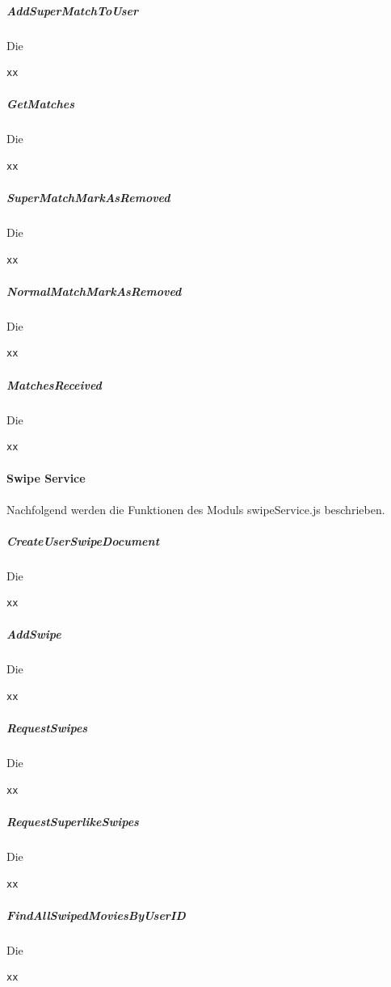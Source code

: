 \subparagraph{AddSuperMatchToUser}
Die

\begin{lstlisting}[caption=TODO, label=lst:TODO]
xx
\end{lstlisting}

\subparagraph{GetMatches}
Die

\begin{lstlisting}[caption=TODO, label=lst:TODO]
xx
\end{lstlisting}

\subparagraph{SuperMatchMarkAsRemoved}
Die

\begin{lstlisting}[caption=TODO, label=lst:TODO]
xx
\end{lstlisting}

\subparagraph{NormalMatchMarkAsRemoved}
Die

\begin{lstlisting}[caption=TODO, label=lst:TODO]
xx
\end{lstlisting}

\subparagraph{MatchesReceived}
Die

\begin{lstlisting}[caption=TODO, label=lst:TODO]
xx
\end{lstlisting}

\paragraph{Swipe Service}
Nachfolgend werden die Funktionen des Moduls 
swipeService.js beschrieben.

\subparagraph{CreateUserSwipeDocument}
Die

\begin{lstlisting}[caption=TODO, label=lst:TODO]
xx
\end{lstlisting}

\subparagraph{AddSwipe}
Die

\begin{lstlisting}[caption=TODO, label=lst:TODO]
xx
\end{lstlisting}

\subparagraph{RequestSwipes}
Die

\begin{lstlisting}[caption=TODO, label=lst:TODO]
xx
\end{lstlisting}

\subparagraph{RequestSuperlikeSwipes}
Die

\begin{lstlisting}[caption=TODO, label=lst:TODO]
xx
\end{lstlisting}

\subparagraph{FindAllSwipedMoviesByUserID}
Die

\begin{lstlisting}[caption=TODO, label=lst:TODO]
xx
\end{lstlisting}
